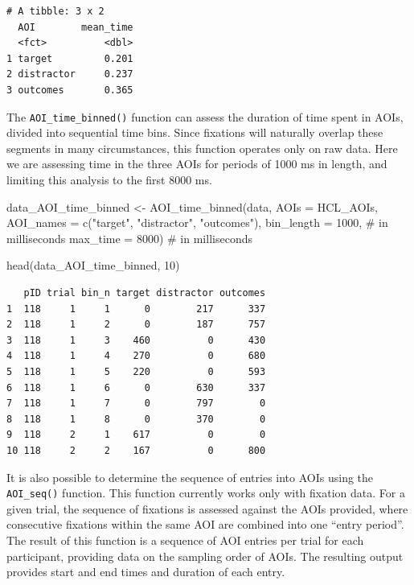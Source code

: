 \documentclass[
  man,
  floatsintext,
  longtable,
  nolmodern,
  notxfonts,
  notimes,
  colorlinks=true,linkcolor=blue,citecolor=blue,urlcolor=blue]{apa7}
\newenvironment{Shaded}{\begin{snugshade}}{\end{snugshade}}
\newcommand{\AttributeTok}[1]{\textcolor[rgb]{0.40,0.45,0.13}{#1}}
\newcommand{\CommentTok}[1]{\textcolor[rgb]{0.37,0.37,0.37}{#1}}
\newcommand{\DecValTok}[1]{\textcolor[rgb]{0.68,0.00,0.00}{#1}}
\newcommand{\FunctionTok}[1]{\textcolor[rgb]{0.28,0.35,0.67}{#1}}
\newcommand{\NormalTok}[1]{\textcolor[rgb]{0.00,0.23,0.31}{#1}}
\newcommand{\OtherTok}[1]{\textcolor[rgb]{0.00,0.23,0.31}{#1}}
\newcommand{\StringTok}[1]{\textcolor[rgb]{0.13,0.47,0.30}{#1}}
\begin{document}
\begin{verbatim}
# A tibble: 3 x 2
  AOI        mean_time
  <fct>          <dbl>
1 target         0.201
2 distractor     0.237
3 outcomes       0.365
\end{verbatim}

The \texttt{AOI\_time\_binned()} function can assess the duration of
time spent in AOIs, divided into sequential time bins. Since fixations
will naturally overlap these segments in many circumstances, this
function operates only on raw data. Here we are assessing time in the
three AOIs for periods of 1000 ms in length, and limiting this analysis
to the first 8000 ms.

\begin{Shaded}
\begin{Highlighting}[]
\NormalTok{data\_AOI\_time\_binned }\OtherTok{\textless{}{-}} 
  \FunctionTok{AOI\_time\_binned}\NormalTok{(data, }
                  \AttributeTok{AOIs =}\NormalTok{ HCL\_AOIs,}
                  \AttributeTok{AOI\_names =} \FunctionTok{c}\NormalTok{(}\StringTok{"target"}\NormalTok{, }\StringTok{"distractor"}\NormalTok{, }\StringTok{"outcomes"}\NormalTok{),}
                  \AttributeTok{bin\_length =} \DecValTok{1000}\NormalTok{, }\CommentTok{\# in milliseconds}
                  \AttributeTok{max\_time =} \DecValTok{8000}\NormalTok{) }\CommentTok{\# in milliseconds}

\FunctionTok{head}\NormalTok{(data\_AOI\_time\_binned, }\DecValTok{10}\NormalTok{)}
\end{Highlighting}
\end{Shaded}

\begin{verbatim}
   pID trial bin_n target distractor outcomes
1  118     1     1      0        217      337
2  118     1     2      0        187      757
3  118     1     3    460          0      430
4  118     1     4    270          0      680
5  118     1     5    220          0      593
6  118     1     6      0        630      337
7  118     1     7      0        797        0
8  118     1     8      0        370        0
9  118     2     1    617          0        0
10 118     2     2    167          0      800
\end{verbatim}

It is also possible to determine the sequence of entries into AOIs using
the \texttt{AOI\_seq()} function. This function currently works only
with fixation data. For a given trial, the sequence of fixations is
assessed against the AOIs provided, where consecutive fixations within
the same AOI are combined into one ``entry period''. The result of this
function is a sequence of AOI entries per trial for each participant,
providing data on the sampling order of AOIs. The resulting output
provides start and end times and duration of each entry.
\end{document}
